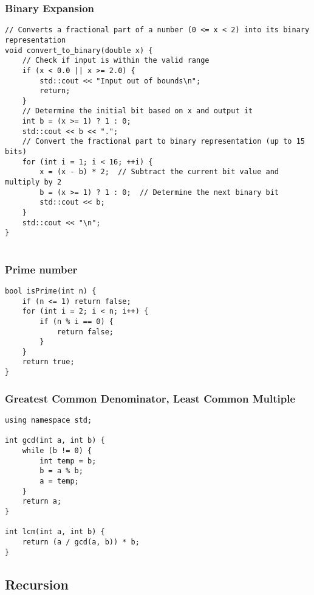 \subsubsection{Binary Expansion}
\begin{lstlisting}[style = codeexpert]
// Converts a fractional part of a number (0 <= x < 2) into its binary representation
void convert_to_binary(double x) {
    // Check if input is within the valid range
    if (x < 0.0 || x >= 2.0) {
        std::cout << "Input out of bounds\n";
        return;
    }
    // Determine the initial bit based on x and output it
    int b = (x >= 1) ? 1 : 0;
    std::cout << b << ".";
    // Convert the fractional part to binary representation (up to 15 bits)
    for (int i = 1; i < 16; ++i) {
        x = (x - b) * 2;  // Subtract the current bit value and multiply by 2
        b = (x >= 1) ? 1 : 0;  // Determine the next binary bit
        std::cout << b;
    }
    std::cout << "\n";
}


\end{lstlisting}

\subsubsection{Prime number}
\begin{lstlisting}[style = codeexpert]
bool isPrime(int n) {
    if (n <= 1) return false;
    for (int i = 2; i < n; i++) {
        if (n % i == 0) {
            return false;
        }
    }
    return true;
}
\end{lstlisting}

\subsubsection{Greatest Common Denominator, Least Common Multiple}
\begin{lstlisting}[style = codeexpert]
using namespace std;

int gcd(int a, int b) {
    while (b != 0) {
        int temp = b;
        b = a % b;
        a = temp;
    }
    return a;
}

int lcm(int a, int b) {
    return (a / gcd(a, b)) * b;
}
\end{lstlisting}
\columnbreak
\subsection{Recursion}
